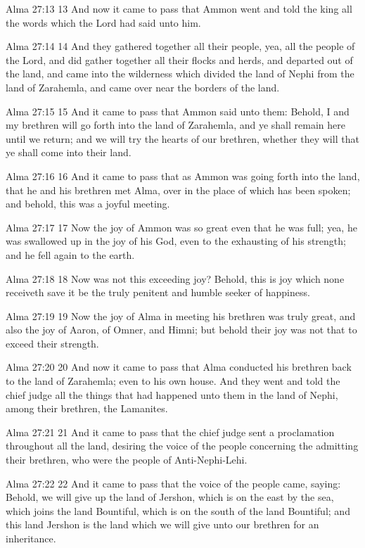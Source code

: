 Alma 27:13
 13 And now it came to pass that Ammon went and told the king all
the words which the Lord had said unto him.

Alma 27:14
 14 And they gathered together all their people, yea, all the
people of the Lord, and did gather together all their flocks and
herds, and departed out of the land, and came into the wilderness
which divided the land of Nephi from the land of Zarahemla, and
came over near the borders of the land.

Alma 27:15
 15 And it came to pass that Ammon said unto them: Behold, I and
my brethren will go forth into the land of Zarahemla, and ye
shall remain here until we return; and we will try the hearts of
our brethren, whether they will that ye shall come into their
land.

Alma 27:16
 16 And it came to pass that as Ammon was going forth into the
land, that he and his brethren met Alma, over in the place of
which has been spoken; and behold, this was a joyful meeting.

Alma 27:17
 17 Now the joy of Ammon was so great even that he was full; yea,
he was swallowed up in the joy of his God, even to the exhausting
of his strength; and he fell again to the earth.

Alma 27:18
 18 Now was not this exceeding joy? Behold, this is joy which
none receiveth save it be the truly penitent and humble seeker of
happiness.

Alma 27:19
 19 Now the joy of Alma in meeting his brethren was truly great,
and also the joy of Aaron, of Omner, and Himni; but behold their
joy was not that to exceed their strength.

Alma 27:20
 20 And now it came to pass that Alma conducted his brethren back
to the land of Zarahemla; even to his own house. And they went
and told the chief judge all the things that had happened unto
them in the land of Nephi, among their brethren, the Lamanites.

Alma 27:21
 21 And it came to pass that the chief judge sent a proclamation
throughout all the land, desiring the voice of the people
concerning the admitting their brethren, who were the people of
Anti-Nephi-Lehi.

Alma 27:22
 22 And it came to pass that the voice of the people came,
saying: Behold, we will give up the land of Jershon, which is on
the east by the sea, which joins the land Bountiful, which is on
the south of the land Bountiful; and this land Jershon is the
land which we will give unto our brethren for an inheritance.

